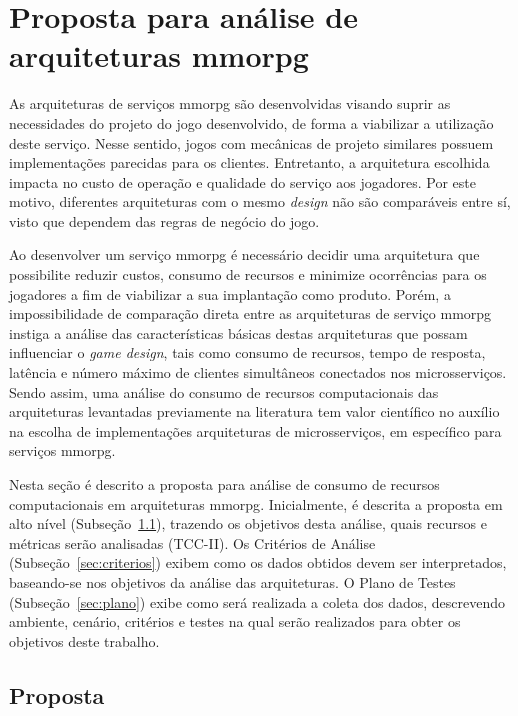 \chapter{Proposta para análise de arquiteturas \ac{mmorpg}}
\label{cap3}



As arquiteturas de serviços \ac{mmorpg} são desenvolvidas visando suprir as necessidades do projeto do jogo desenvolvido, de forma a viabilizar a utilização deste serviço.
%
Nesse sentido, jogos com mecânicas de projeto similares possuem implementações parecidas para os clientes.
%
Entretanto, a arquitetura escolhida impacta no custo de operação e qualidade do serviço aos jogadores.
%
Por este motivo, diferentes arquiteturas com o mesmo \textit{design} não são comparáveis entre sí, visto que dependem das regras de negócio do jogo.



Ao desenvolver um serviço \ac{mmorpg} é necessário decidir uma arquitetura que possibilite reduzir custos, consumo de recursos e minimize ocorrências para os jogadores a fim de viabilizar a sua implantação como produto.
%
Porém, a impossibilidade de comparação direta entre as arquiteturas de serviço \ac{mmorpg} instiga a análise das características básicas destas arquiteturas que possam influenciar o \textit{game design}, tais como consumo de recursos, tempo de resposta, latência e número máximo de clientes simultâneos conectados nos microsserviços.
%
Sendo assim, uma análise do consumo de recursos computacionais das arquiteturas levantadas previamente na literatura tem valor científico no auxílio na escolha de implementações arquiteturas de microsserviços, em específico para serviços \ac{mmorpg}.



Nesta seção é descrito a proposta para análise de consumo de recursos computacionais em arquiteturas \ac{mmorpg}.
%
Inicialmente, é descrita a proposta em alto nível (Subseção~\ref{sec:proposta}), trazendo os objetivos desta análise, quais recursos e métricas serão analisadas (TCC-II).
%
Os Critérios de Análise (Subseção~\ref{sec:criterios}) exibem como os dados obtidos devem ser interpretados, baseando-se nos objetivos da análise das arquiteturas.
%
O Plano de Testes (Subseção~\ref{sec:plano}) exibe como será realizada a coleta dos dados, descrevendo ambiente, cenário, critérios e testes na qual serão realizados para obter os objetivos deste trabalho.
%

\section{Proposta}
\label{sec:proposta}

